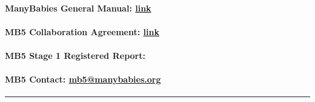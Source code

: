 \documentclass[
]{book}
\theoremstyle{definition}
\theoremstyle{definition}
\theoremstyle{definition}
\theoremstyle{definition}
\theoremstyle{remark}
\begin{document}
\hypertarget{manybabies-general-manual-link}{%
\paragraph*{\texorpdfstring{\textbf{ManyBabies General Manual:} \href{https://docs.google.com/document/d/1dZ3sF2UcxvpkfOfKSKFeObTMZRbpUYloMUiPYtZy0ng/edit?usp=sharing}{link}}{ManyBabies General Manual: link}}\label{manybabies-general-manual-link}}

\hypertarget{mb5-collaboration-agreement-link}{%
\paragraph*{\texorpdfstring{\textbf{MB5 Collaboration Agreement:} \href{https://docs.google.com/document/d/1vbTDmH6euda5pJN4uyds3zsnQ1DXrW9wpHogwC-5TSk/edit?usp=sharing}{link}}{MB5 Collaboration Agreement: link}}\label{mb5-collaboration-agreement-link}}

\hypertarget{mb5-stage-1-registered-report-kosiezettersten2024}{%
\paragraph*{\texorpdfstring{\textbf{MB5 Stage 1 Registered Report:} \citep{kosiezettersten2024}}{MB5 Stage 1 Registered Report: {[}@kosiezettersten2024{]}}}\label{mb5-stage-1-registered-report-kosiezettersten2024}}

\hypertarget{mb5-contact-mb5manybabies.org}{%
\paragraph*{\texorpdfstring{\textbf{MB5 Contact:} \url{mb5@manybabies.org} }{MB5 Contact: mb5@manybabies.org }}\label{mb5-contact-mb5manybabies.org}}

\begin{center}\rule{0.5\linewidth}{0.5pt}\end{center}
\end{document}
